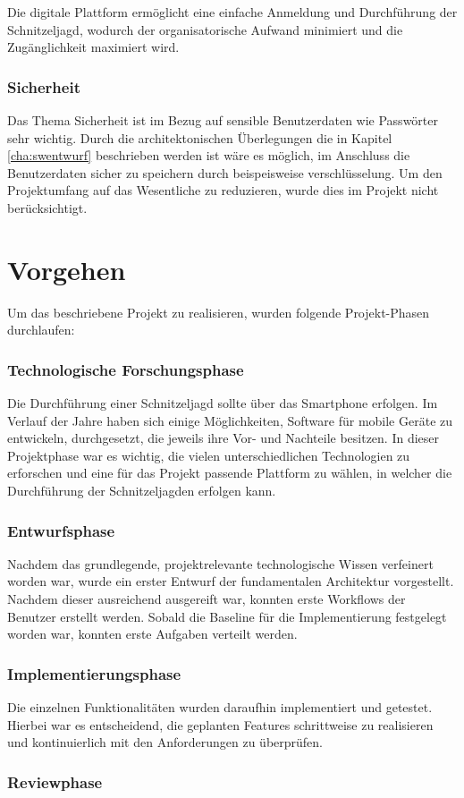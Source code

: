 Die digitale Plattform ermöglicht eine einfache Anmeldung und Durchführung der Schnitzeljagd, wodurch der organisatorische Aufwand minimiert und die Zugänglichkeit maximiert wird.

\subsubsection{Sicherheit}

Das Thema Sicherheit ist im Bezug auf sensible Benutzerdaten wie Passwörter sehr wichtig. Durch die architektonischen Überlegungen die in Kapitel \ref{cha:swentwurf} beschrieben werden ist wäre es möglich, im Anschluss die Benutzerdaten sicher zu speichern durch beispeisweise verschlüsselung. Um den Projektumfang auf das Wesentliche zu reduzieren, wurde dies im Projekt nicht berücksichtigt.

\section{Vorgehen}

Um das beschriebene Projekt zu realisieren, wurden folgende Projekt-Phasen durchlaufen:

\subsubsection{Technologische Forschungsphase}

Die Durchführung einer Schnitzeljagd sollte über das Smartphone erfolgen. Im Verlauf der Jahre haben sich einige Möglichkeiten, Software für mobile Geräte zu entwickeln, durchgesetzt, die jeweils ihre Vor- und Nachteile besitzen. In dieser Projektphase war es wichtig, die vielen unterschiedlichen Technologien zu erforschen und eine für das Projekt passende Plattform zu wählen, in welcher die Durchführung der Schnitzeljagden erfolgen kann.

\subsubsection{Entwurfsphase}

Nachdem das grundlegende, projektrelevante technologische Wissen verfeinert worden war, wurde ein erster Entwurf der fundamentalen Architektur vorgestellt. Nachdem dieser ausreichend ausgereift war, konnten erste Workflows der Benutzer erstellt werden. Sobald die Baseline für die Implementierung festgelegt worden war, konnten erste Aufgaben verteilt werden.

\subsubsection{Implementierungsphase}

Die einzelnen Funktionalitäten wurden daraufhin implementiert und getestet. Hierbei war es entscheidend, die geplanten Features schrittweise zu realisieren und kontinuierlich mit den Anforderungen zu überprüfen.

\subsubsection{Reviewphase}

